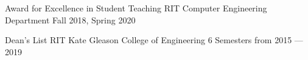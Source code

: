 
\begin{cvhonors}

  \cvhonor
	{Award for Excellence in Student Teaching}
	{RIT Computer Engineering Department}
	{Fall 2018, Spring 2020}

  \cvhonor
    {Dean's List} %
    {RIT Kate Gleason College of Engineering} %
    {6 Semesters from 2015 --- 2019} %

\end{cvhonors}
